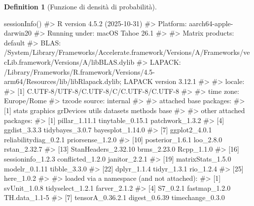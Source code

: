 \documentclass[
  letterpaper,
  DIV=11,
  numbers=noendperiod,
  oneside]{scrreprt}
\newenvironment{Shaded}{\begin{snugshade}}{\end{snugshade}}
\newcommand{\CommentTok}[1]{\textcolor[rgb]{0.37,0.37,0.37}{#1}}
\newcommand{\FunctionTok}[1]{\textcolor[rgb]{0.28,0.35,0.67}{#1}}
\newcommand{\NormalTok}[1]{\textcolor[rgb]{0.00,0.23,0.31}{#1}}
\theoremstyle{definition}
\theoremstyle{plain}
\theoremstyle{definition}
\newtheorem{definition}{Definition}[chapter]
\theoremstyle{remark}
\begin{document}
\begin{definition}[Funzione di densità di
probabilità]
\begin{tcolorbox}
\begin{Shaded}
\begin{Highlighting}[]
\FunctionTok{sessionInfo}\NormalTok{()}
\CommentTok{\#\textgreater{} R version 4.5.2 (2025{-}10{-}31)}
\CommentTok{\#\textgreater{} Platform: aarch64{-}apple{-}darwin20}
\CommentTok{\#\textgreater{} Running under: macOS Tahoe 26.1}
\CommentTok{\#\textgreater{} }
\CommentTok{\#\textgreater{} Matrix products: default}
\CommentTok{\#\textgreater{} BLAS:   /System/Library/Frameworks/Accelerate.framework/Versions/A/Frameworks/vecLib.framework/Versions/A/libBLAS.dylib }
\CommentTok{\#\textgreater{} LAPACK: /Library/Frameworks/R.framework/Versions/4.5{-}arm64/Resources/lib/libRlapack.dylib;  LAPACK version 3.12.1}
\CommentTok{\#\textgreater{} }
\CommentTok{\#\textgreater{} locale:}
\CommentTok{\#\textgreater{} [1] C.UTF{-}8/UTF{-}8/C.UTF{-}8/C/C.UTF{-}8/C.UTF{-}8}
\CommentTok{\#\textgreater{} }
\CommentTok{\#\textgreater{} time zone: Europe/Rome}
\CommentTok{\#\textgreater{} tzcode source: internal}
\CommentTok{\#\textgreater{} }
\CommentTok{\#\textgreater{} attached base packages:}
\CommentTok{\#\textgreater{} [1] stats     graphics  grDevices utils     datasets  methods   base     }
\CommentTok{\#\textgreater{} }
\CommentTok{\#\textgreater{} other attached packages:}
\CommentTok{\#\textgreater{}  [1] pillar\_1.11.1         tinytable\_0.15.1      patchwork\_1.3.2      }
\CommentTok{\#\textgreater{}  [4] ggdist\_3.3.3          tidybayes\_3.0.7       bayesplot\_1.14.0     }
\CommentTok{\#\textgreater{}  [7] ggplot2\_4.0.1         reliabilitydiag\_0.2.1 priorsense\_1.2.0     }
\CommentTok{\#\textgreater{} [10] posterior\_1.6.1       loo\_2.8.0             rstan\_2.32.7         }
\CommentTok{\#\textgreater{} [13] StanHeaders\_2.32.10   brms\_2.23.0           Rcpp\_1.1.0           }
\CommentTok{\#\textgreater{} [16] sessioninfo\_1.2.3     conflicted\_1.2.0      janitor\_2.2.1        }
\CommentTok{\#\textgreater{} [19] matrixStats\_1.5.0     modelr\_0.1.11         tibble\_3.3.0         }
\CommentTok{\#\textgreater{} [22] dplyr\_1.1.4           tidyr\_1.3.1           rio\_1.2.4            }
\CommentTok{\#\textgreater{} [25] here\_1.0.2           }
\CommentTok{\#\textgreater{} }
\CommentTok{\#\textgreater{} loaded via a namespace (and not attached):}
\CommentTok{\#\textgreater{}  [1] svUnit\_1.0.8          tidyselect\_1.2.1      farver\_2.1.2         }
\CommentTok{\#\textgreater{}  [4] S7\_0.2.1              fastmap\_1.2.0         TH.data\_1.1{-}5        }
\CommentTok{\#\textgreater{}  [7] tensorA\_0.36.2.1      digest\_0.6.39         timechange\_0.3.0     }

\end{Highlighting}
\end{Shaded}
\end{tcolorbox}
\end{definition}
\end{document}
